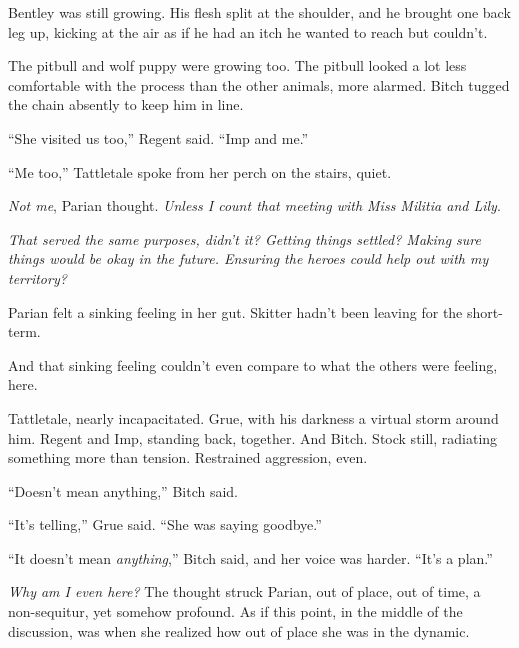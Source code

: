 Bentley was still growing.  His flesh split at the shoulder, and he brought one back leg up, kicking at the air as if he had an itch he wanted to reach but couldn't.



The pitbull and wolf puppy were growing too.  The pitbull looked a lot less comfortable with the process than the other animals, more alarmed.  Bitch tugged the chain absently to keep him in line.



``She visited us too,'' Regent said.  ``Imp and me.''



``Me too,'' Tattletale spoke from her perch on the stairs, quiet.



\emph{Not me}, Parian thought.  \emph{Unless I count that meeting with Miss Militia and Lily}.



\emph{That served the same purposes, didn't it?  Getting things settled?  Making sure things would be okay in the future.  Ensuring the heroes could help out with my territory?}



Parian felt a sinking feeling in her gut.  Skitter hadn't been leaving for the short-term.



And that sinking feeling couldn't even compare to what the others were feeling, here.



Tattletale, nearly incapacitated.  Grue, with his darkness a virtual storm around him.  Regent and Imp, standing back, together.  And Bitch.  Stock still, radiating something more than tension.  Restrained aggression, even.



``Doesn't mean anything,'' Bitch said.



``It's telling,'' Grue said.  ``She was saying goodbye.''



``It doesn't mean \emph{anything},'' Bitch said, and her voice was harder.  ``It's a plan.''



\emph{Why am I even here?  }The thought struck Parian, out of place, out of time, a non-sequitur, yet somehow profound.  As if this point, in the middle of the discussion, was when she realized how out of place she was in the dynamic.\emph{ }



